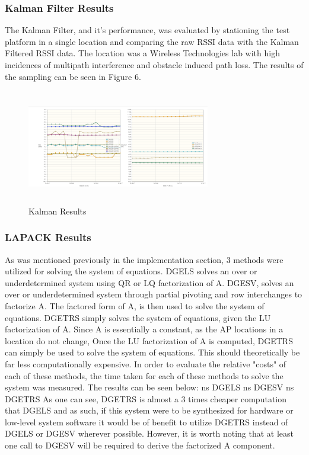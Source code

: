 \documentclass[conference]{IEEEtran}
\begin{document}
\subsubsection{Kalman Filter Results}
The Kalman Filter, and it's performance, was evaluated by stationing the test platform in a single location and comparing the raw RSSI data with the Kalman Filtered RSSI data. The location was a Wireless Technologies lab with high incidences of multipath interference and obstacle induced path loss. The results of the sampling can be seen in Figure 6.
\begin{figure}[H]
    \includegraphics[width=8cm,height=5cm]{2018-05-10-PHOTO-00000079.png}
    \caption{Kalman Results}
    \end{figure}
\subsubsection{LAPACK Results}
As was mentioned previously in the implementation section, 3 methods were utilized for solving the system of equations. DGELS solves an over or underdetermined system using QR or LQ factorization of A. DGESV, solves an over or underdetermined system through partial pivoting and row interchanges to factorize A. The factored form of A, is then used to solve the system of equations. DGETRS simply solves the system of equations, given the LU factorization of A. Since A is essentially a constant, as the AP locations in a location do not change, Once the LU factorization of A is computed, DGETRS can simply be used to solve the system of equations. This should theoretically be far less computationally expensive. In order to evaluate the relative "costs" of each of these methods, the time taken for each of these methods to solve the system was measured. The results can be seen below: ns DGELS ns DGESV ns DGETRS\newline
As one can see, DGETRS is almost a 3 times cheaper computation that DGELS and as such, if this system were to be synthesized for hardware or low-level system software it would be of benefit to utilize DGETRS instead of DGELS or DGESV wherever possible. However, it is worth noting that at least one call to DGESV will be required to derive the factorized A component.
\end{document}
